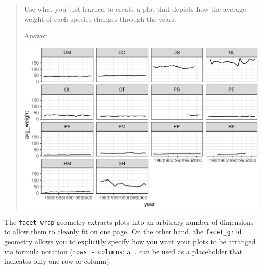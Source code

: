 \documentclass[]{book}
\newenvironment{Shaded}{\begin{snugshade}}{\end{snugshade}}
\newcommand{\KeywordTok}[1]{\textcolor[rgb]{0.13,0.29,0.53}{\textbf{#1}}}
\newcommand{\DataTypeTok}[1]{\textcolor[rgb]{0.13,0.29,0.53}{#1}}
\newcommand{\StringTok}[1]{\textcolor[rgb]{0.31,0.60,0.02}{#1}}
\newcommand{\OperatorTok}[1]{\textcolor[rgb]{0.81,0.36,0.00}{\textbf{#1}}}
\newcommand{\NormalTok}[1]{#1}
\begin{document}
\begin{quote}
Use what you just learned to create a plot that depicts how the average
weight of each species changes through the years.

Answer

\begin{Shaded}
\end{Shaded}

\includegraphics{img/R-ecology-average-weight-time-series-1.pdf}
\end{quote}

The \texttt{facet\_wrap} geometry extracts plots into an arbitrary
number of dimensions to allow them to cleanly fit on one page. On the
other hand, the \texttt{facet\_grid} geometry allows you to explicitly
specify how you want your plots to be arranged via formula notation
(\texttt{rows\ \textasciitilde{}\ columns}; a \texttt{.} can be used as
a placeholder that indicates only one row or column).
\end{document}
